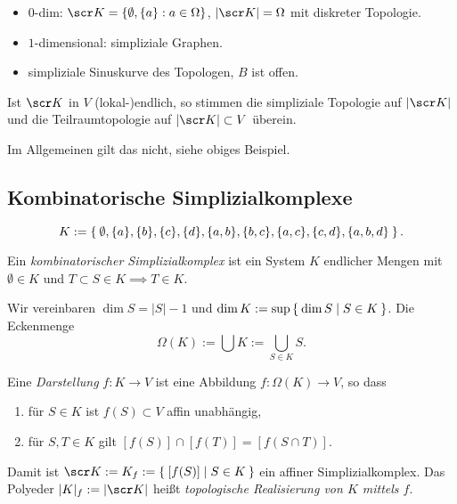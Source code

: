 \begin{ex}[Gegenbeispiele]
\end{ex}

\begin{ex}
	\begin{itemize}
		\item
			$0$-dim: $\scr K = \{ \emptyset, \{a\} : a \in \Omega \}$, $|\scr K| = \Omega$ mit diskreter Topologie.
		\item
			$1$-dimensional: simpliziale Graphen.
		\item
			simpliziale Sinuskurve des Topologen, $B$ ist offen.
	\end{itemize}
\end{ex}

\begin{nt}
	Ist $\scr K$ in $V$ (lokal-)endlich, so stimmen die simpliziale Topologie auf $|\scr K|$ und die Teilraumtopologie auf $|\scr K| \subset V$ überein.

	Im Allgemeinen gilt das nicht, siehe obiges Beispiel.
\end{nt}


\subsection{Kombinatorische Simplizialkomplexe}

\[
	K := \Set{ \emptyset, \{a\}, \{b\}, \{c\}, \{d\}, \{a,b\}, \{b,c\}, \{a,c\}, \{c,d\}, \{a,b,d\} }.
\]

\begin{df}
	Ein \emph{kombinatorischer Simplizialkomplex} ist ein System $K$ endlicher Mengen mit $\emptyset \in K$ und $T \subset S \in K \implies T \in K$.

	Wir vereinbaren $\dim S = |S| - 1$ und $\dim K := \sup \Set{ \dim S | S \in K }$.
	Die Eckenmenge
	\[
		\Omega(K) := \bigcup K := \bigcup_{S \in K} S.
	\]
\end{df}

\begin{df}
	Eine \emph{Darstellung} $f: K \to V$ ist eine Abbildung $f: \Omega(K) \to V$, so dass
	\begin{enumerate}[1)]
		\item
			für $S \in K$ ist $f(S) \subset V$ affin unabhängig,
		\item
			für $S, T \in K$ gilt $[f(S)] \cap [f(T)] = [f(S \cap T)]$.
	\end{enumerate}
	Damit ist $\scr K := K_f := \Set{ [f(S)] | S \in K }$ ein affiner Simplizialkomplex.
	Das Polyeder $|K|_f := |\scr K|$ heißt \emph{topologische Realisierung von $K$ mittels $f$}.
\end{df}


